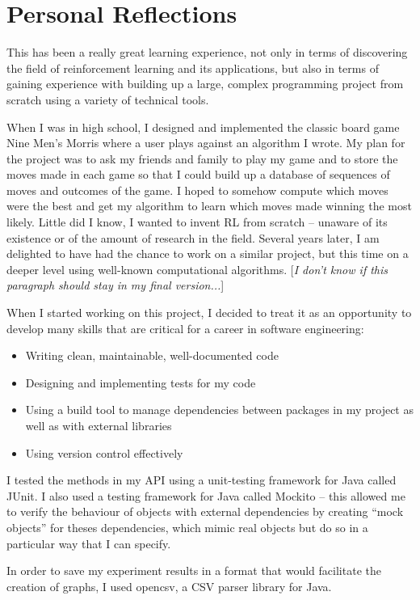 \documentclass[11pt,a4paper]{report}
\begin{document}
\section{Personal Reflections}

This has been a really great learning experience, not only in terms of discovering the field of reinforcement learning and its applications, but also in terms of gaining experience with building up a large, complex programming project from scratch using a variety of technical tools.

When I was in high school, I designed and implemented the classic board game Nine Men’s Morris where a user plays against an algorithm I wrote. My plan for the project was to ask my friends and family to play my game and to store the moves made in each game so that I could build up a database of sequences of moves and outcomes of the game. I hoped to somehow compute which moves were the best and get my algorithm to learn which moves made winning the most likely. Little did I know, I wanted to invent RL from scratch – unaware of its existence or of the amount of research in the field. Several years later, I am delighted to have had the chance to work on a similar project, but this time on a deeper level using well-known computational algorithms. [\emph{I don't know if this paragraph should stay in my final version...}]

When I started working on this project, I decided to treat it as an opportunity to develop many skills that are critical for a career in software engineering:

\begin{itemize}
	\item Writing clean, maintainable, well-documented code
	\item Designing and implementing tests for my code
	\item Using a build tool to manage dependencies between packages in my project as well as with external libraries
	\item Using version control effectively
\end{itemize}

I tested the methods in my API using a unit-testing framework for Java called JUnit. I also used a testing framework for Java called Mockito – this allowed me to verify the behaviour of objects with external dependencies by creating “mock objects” for theses dependencies, which mimic real objects but do so in a particular way that I can specify.

In order to save my experiment results in a format that would facilitate the creation of graphs, I used opencsv, a CSV parser library for Java.
\end{document}
